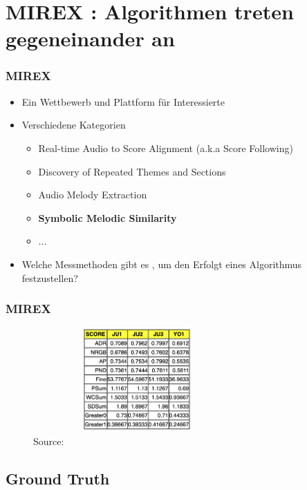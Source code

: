 \documentclass{beamer}
\begin{document}
	\section{MIREX : Algorithmen treten gegeneinander an}

	\begin{frame}
		\frametitle{MIREX}
		\begin{itemize}
			\item Ein Wettbewerb und Plattform für Interessierte
			\item Verschiedene Kategorien
				\begin{itemize}
					\item Real-time Audio to Score Alignment (a.k.a Score Following)
					\item Discovery of Repeated Themes and Sections
					\item Audio Melody Extraction
					\item \textbf{Symbolic Melodic Similarity}
					\item ...
				\end{itemize}
			\item Welche Messmethoden gibt es , um den Erfolgt eines Algorithmus festzustellen?
		\end{itemize}
	\end{frame}

	\begin{frame}
		\frametitle{MIREX}
		\begin{figure}[h!]
			\includegraphics[width=300px,height=150px,keepaspectratio]{MIREX_2014_results}
			\caption{Source: \cite{mirex_website_2014_results}}
		\end{figure}
	\end{frame}


	\subsection{Ground Truth}
		
\end{document}
